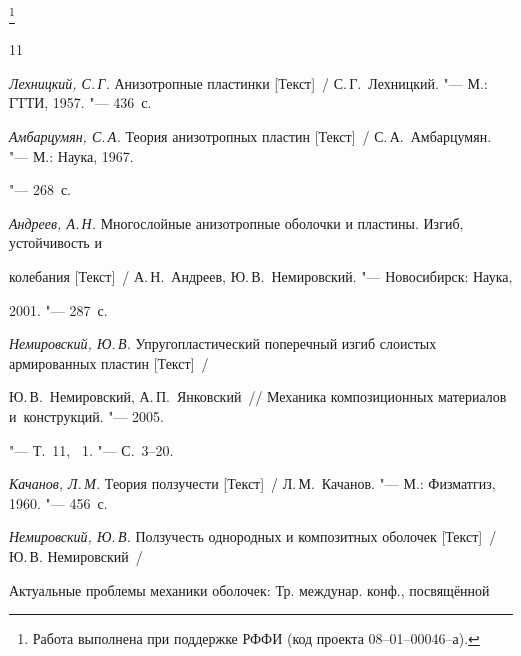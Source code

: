 \thanks{Работа выполнена при поддержке РФФИ {\rm(}код проекта 08--01--00046--а{\rm)}.}











\begin{thebibliography}{11}

\item 

\textit{Лехницкий, С.\,Г.} Анизотропные пластинки [Текст]~/ С.\,Г.~Лехницкий. "--- М.: ГТТИ, 1957. "--- 436~с.



\item 

\textit{Амбарцумян, С.\,А.} Теория анизотропных пластин [Текст]~/ С.\,А.~Амбарцумян. "--- М.: Наука, 1967. 

"--- 268~с.



\item 

\textit{Андреев, А.\,Н.} Многослойные анизотропные оболочки и пластины. Изгиб, устойчивость и 

колебания [Текст]~/ А.\,Н.~Андреев, Ю.\,В.~Немировский. "--- Новосибирск: Наука, 

2001. "--- 287~с.



\item 

\textit{Немировский, Ю.\,В.} Упругопластический поперечный изгиб слоистых армированных пластин [Текст]~/ 

Ю.\,В.~Немировский, А.\,П.~Янковский~/\!/ Механика композиционных материалов и~конструкций. "--- 2005. 

"--- Т.~11, \No~1. "--- С.~3--20.



\item 

\textit{Качанов, Л.\,М.} Теория ползучести [Текст]~/ Л.\,М.~Качанов. "--- М.: Физматгиз, 1960. "--- 456~с.



\item 

\textit{Немировский, Ю.\,В.} Ползучесть однородных и композитных оболочек [Текст]~/ Ю.\,В. Немировский~/ 

Актуальные проблемы механики оболочек: Тр. междунар. конф., посвящённой 


\end{thebibliography}

